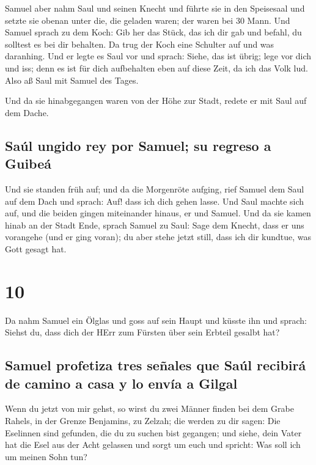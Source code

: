  Samuel aber nahm Saul und seinen Knecht und führte sie
in den Speisesaal und setzte sie obenan unter die, die geladen waren;
der waren bei 30 Mann.  Und Samuel sprach zu dem Koch:
Gib her das Stück, das ich dir gab und befahl, du solltest es bei dir
behalten.  Da trug der Koch eine Schulter auf und was
daranhing. Und er legte es Saul vor und sprach: Siehe, das ist übrig;
lege vor dich und iss; denn es ist für dich aufbehalten eben auf diese
Zeit, da ich das Volk lud. Also aß Saul mit Samuel des Tages.

 Und da sie hinabgegangen waren von der Höhe zur Stadt,
redete er mit Saul auf dem Dache.

\hypertarget{sauxfal-ungido-rey-por-samuel-su-regreso-a-guibeuxe1}{%
\subsection{Saúl ungido rey por Samuel; su regreso a
Guibeá}\label{sauxfal-ungido-rey-por-samuel-su-regreso-a-guibeuxe1}}

 Und sie standen früh auf; und da die Morgenröte aufging,
rief Samuel dem Saul auf dem Dach und sprach: Auf! dass ich dich gehen
lasse. Und Saul machte sich auf, und die beiden gingen miteinander
hinaus, er und Samuel.  Und da sie kamen hinab an der
Stadt Ende, sprach Samuel zu Saul: Sage dem Knecht, dass er uns
vorangehe (und er ging voran); du aber stehe jetzt still, dass ich dir
kundtue, was Gott gesagt hat.

\hypertarget{section-9}{%
\section{10}\label{section-9}}

 Da nahm Samuel ein Ölglas und goss auf sein Haupt und
küsste ihn und sprach: Siehst du, dass dich der HErr zum Fürsten über
sein Erbteil gesalbt hat?

\hypertarget{samuel-profetiza-tres-seuxf1ales-que-sauxfal-recibiruxe1-de-camino-a-casa-y-lo-envuxeda-a-gilgal}{%
\subsection{Samuel profetiza tres señales que Saúl recibirá de camino a
casa y lo envía a
Gilgal}\label{samuel-profetiza-tres-seuxf1ales-que-sauxfal-recibiruxe1-de-camino-a-casa-y-lo-envuxeda-a-gilgal}}

 Wenn du jetzt von mir gehst, so wirst du zwei Männer
finden bei dem Grabe Rahels, in der Grenze Benjamins, zu Zelzah; die
werden zu dir sagen: Die Eselinnen sind gefunden, die du zu suchen bist
gegangen; und siehe, dein Vater hat die Esel aus der Acht gelassen und
sorgt um euch und spricht: Was soll ich um meinen Sohn tun?

